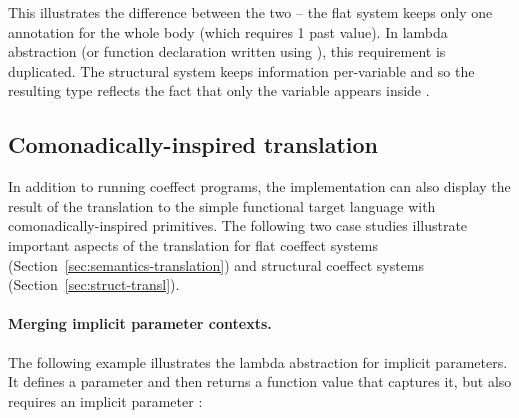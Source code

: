 This illustrates the difference between the two -- the flat system keeps only one annotation
for the whole body (which requires 1 past value). In lambda abstraction (or function declaration
written using ), this requirement is duplicated. The structural system keeps information
per-variable and so the resulting type reflects the fact that only the variable  appears
inside .


\subsection{Comonadically-inspired translation}
\label{sec:impl-case-transl}

In addition to running coeffect programs, the implementation can also display the result of the
translation to the simple functional target language with comonadically-inspired primitives.
The following two case studies illustrate important aspects of the translation for flat coeffect
systems (Section~\ref{sec:semantics-translation}) and structural coeffect systems (Section~\ref{sec:struct-transl}).

\paragraph{Merging implicit parameter contexts.}

The following example illustrates the lambda abstraction for implicit parameters.
It defines a parameter  and then returns a function value that captures it, but
also requires an implicit parameter :

